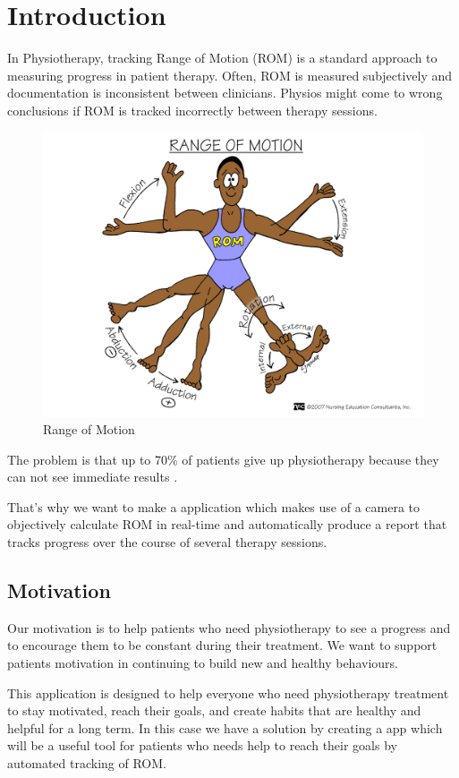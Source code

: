 \chapter{Introduction}
\par In Physiotherapy, tracking Range of Motion (ROM) is a standard approach to measuring progress in patient therapy. Often, ROM is measured subjectively and documentation is inconsistent between clinicians. Physios might come to wrong conclusions if ROM is tracked incorrectly between therapy sessions.

\begin{figure}[htbp]
	\centerline{\includegraphics[scale=0.25]{fig/rangeofmotion.png}}  
	\caption{Range of Motion}
\end{figure}

\par The problem is that up to 70\% of patients give up physiotherapy because they can not see immediate results \cite{7FactsInPhysicalTherapy}.
\par That's why we want to make a application which makes use of a camera to objectively calculate ROM in real-time and automatically produce a report that tracks progress over the course of several therapy sessions.

\section{Motivation}
\par Our motivation is to help patients who need physiotherapy to see a progress and to encourage them to be constant during their treatment. We want to support patients motivation in continuing to build new and healthy behaviours. 
\par This application is designed to help everyone who need physiotherapy treatment to stay motivated, reach their goals, and create habits that are healthy and helpful for a long term. In this case we have a solution by creating a app which will be a useful tool for patients who needs help to reach their goals by automated tracking of ROM.

